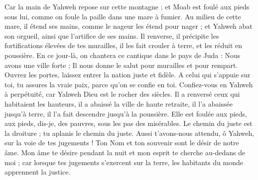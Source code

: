 \begin{multicols}{2}
Car la main de Yahweh repose sur cette montagne ; et Moab est foulé aux pieds sous lui, comme on foule la paille dans une mare à fumier.
Au milieu de cette mare, il étend ses mains, comme le nageur les étend pour nager ; et Yahweh abat son orgueil, ainsi que l'artifice de ses mains.
Il renverse, il précipite les fortifications élevées de tes murailles, il les fait crouler à terre, et les réduit en poussière.
\VerseOne{}En ce jour-là, on chantera ce cantique dans le pays de Juda : Nous avons une ville forte ; Il nous donne le salut pour murailles et pour rempart.
Ouvrez les portes, laissez entrer la nation juste et fidèle.
A celui qui s'appuie sur toi, tu assures la vraie paix, parce qu'on se confie en toi.
Confiez-vous en Yahweh à perpétuité, car Yahweh Dieu est le rocher des siècles.
Il a renversé ceux qui habitaient les hauteurs, il a abaissé la ville de haute retraite, il l'a abaissée jusqu'à terre, il l'a fait descendre jusqu'à la poussière.
Elle est foulée aux pieds, aux pieds, dis-je, des pauvres, sous les pas des misérables.
Le chemin du juste est la droiture ; tu aplanis le chemin du juste.
Aussi t'avons-nous attendu, ô Yahweh, sur la voie de tes jugements ! Ton Nom et ton souvenir sont le désir de notre âme.
Mon âme te désire pendant la nuit et mon esprit te cherche au-dedans de moi ; car lorsque tes jugements s'exercent sur la terre, les habitants du monde apprennent la justice.

\end{multicols}
